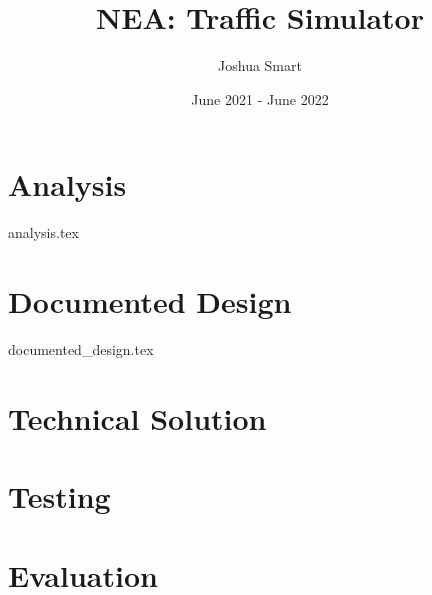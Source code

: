 \documentclass{report}
\title{NEA: Traffic Simulator}
\author{Joshua Smart}
\date{June 2021 - June 2022}
\begin{document}
    \begin{titlepage}
        \maketitle
    \end{titlepage}

    \tableofcontents

    \chapter{Analysis}
        {analysis.tex}

    \chapter{Documented Design}
        {documented_design.tex}

    \chapter{Technical Solution}

    \chapter{Testing}

    \chapter{Evaluation}

\end{document}
